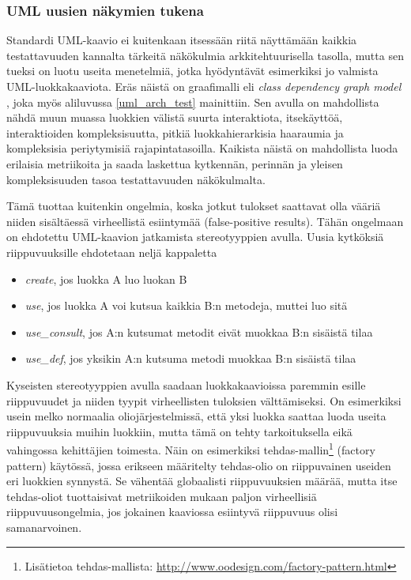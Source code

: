 \documentclass[finnish]{tktltiki2}
\numberwithin{table}{section}
\theoremstyle{definition}
\theoremstyle{remark}
\begin{document}
\subsubsection{UML uusien näkymien tukena}


Standardi UML-kaavio ei kuitenkaan itsessään riitä näyttämään kaikkia testattavuuden kannalta tärkeitä näkökulmia arkkitehtuurisella tasolla, mutta sen tueksi on luotu useita menetelmiä, jotka hyödyntävät esimerkiksi jo valmista UML-luokkakaaviota. Eräs näistä on graafimalli eli \textit{class dependency graph model} \citep{baudry_testability_2002}, joka myös aliluvussa \ref{uml_arch_test} mainittiin. Sen avulla on mahdollista nähdä muun muassa luokkien välistä suurta interaktiota, itsekäyttöä, interaktioiden kompleksisuutta, pitkiä luokkahierarkisia haaraumia ja kompleksisia periytymisiä rajapintatasoilla.
Kaikista näistä on mahdollista luoda erilaisia metriikoita ja saada laskettua kytkennän, perinnän ja yleisen kompleksisuuden tasoa testattavuuden näkökulmalta. 

Tämä tuottaa kuitenkin ongelmia, koska jotkut tulokset saattavat olla vääriä niiden sisältäessä virheellistä esiintymää (false-positive results). Tähän ongelmaan on ehdotettu UML-kaavion jatkamista stereotyyppien avulla. Uusia kytköksiä riippuvuuksille ehdotetaan neljä kappaletta \citep[s. 4]{baudry_measuring_2003}

\begin{itemize}
	\item \textit{create}, jos luokka A luo luokan B
	\item \textit{use}, jos luokka A voi kutsua kaikkia B:n metodeja, muttei luo sitä
	\item \textit{use\_consult}, jos A:n kutsumat metodit eivät muokkaa B:n sisäistä tilaa
	\item \textit{use\_def}, jos yksikin A:n kutsuma metodi muokkaa B:n sisäistä tilaa
\end{itemize}

\noindent
Kyseisten stereotyyppien avulla saadaan luokkakaavioissa paremmin esille riippuvuudet ja niiden tyypit virheellisten tuloksien välttämiseksi. On esimerkiksi usein melko normaalia oliojärjestelmissä, että yksi luokka saattaa luoda useita riippuvuuksia muihin luokkiin, mutta tämä on tehty tarkoituksella eikä vahingossa kehittäjien toimesta. Näin on esimerkiksi tehdas-mallin\footnote{Lisätietoa tehdas-mallista: \url{http://www.oodesign.com/factory-pattern.html}} (factory pattern) käytössä, jossa erikseen määritelty tehdas-olio on riippuvainen useiden eri luokkien synnystä. Se vähentää globaalisti riippuvuuksien määrää, mutta itse tehdas-oliot tuottaisivat metriikoiden mukaan paljon virheellisiä riippuvuusongelmia, jos jokainen kaaviossa esiintyvä riippuvuus olisi samanarvoinen.
\end{document}
